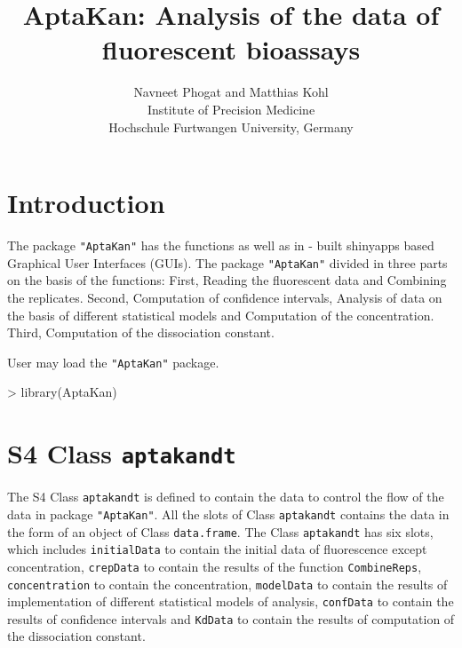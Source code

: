\documentclass[11pt]{article}
\newcommand{\code}[1]{{\tt #1}}
\newcommand{\pkg}[1]{{\tt "#1"}}
\begin{document}



\title{AptaKan: Analysis of the data of fluorescent bioassays}
\author{Navneet Phogat and Matthias Kohl\\
Institute of Precision Medicine\\
Hochschule Furtwangen University, Germany\medskip\\
}
\maketitle
\tableofcontents
\section{Introduction}
The package \pkg{AptaKan} has the functions as well as in - built shinyapps based Graphical User
Interfaces (GUIs). The package \pkg{AptaKan} divided in three parts on the basis of the functions:
First, Reading the fluorescent data and Combining the replicates. Second, Computation of confidence
intervals, Analysis of data on the basis of different statistical models and Computation of the
concentration. Third, Computation of the dissociation constant.

User may load the \pkg{AptaKan} package.
\begin{Schunk}
\begin{Sinput}
> library(AptaKan)
\end{Sinput}
\end{Schunk}

\section {S4 Class \code{aptakandt}}
The S4 Class \code{aptakandt} is defined to contain the data to control the flow of the data in package \pkg{AptaKan}. All the slots of Class \code{aptakandt} contains the data in the form of an object of Class \code{data.frame}. The Class \code{aptakandt} has six slots, which includes
\code{initialData} to contain the initial data of fluorescence except concentration, \code{crepData} to contain the results of the function \code{CombineReps}, \code{concentration} to contain the concentration, \code{modelData} to contain the results of implementation of different statistical models of analysis, \code{confData} to contain the results of confidence intervals and \code{KdData} to contain the results of computation of the dissociation constant.
\end{document}
